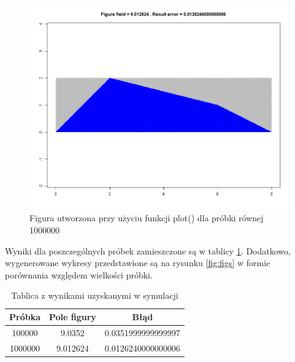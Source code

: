 \documentclass[a4paper,11pt,titlepage]{article}
\begin{document}
\begin{figure}[H]
\centering
\includegraphics[width=1\columnwidth]{img/figure1m.PNG}
\caption{Figura utworzona przy użyciu funkcji plot() dla próbki równej 1000000}
\label{fig:fig1m}
\end{figure}


Wyniki dla poszczególnych próbek zamieszczone są w tablicy \ref{tab:figwynik}. Dodatkowo, wygenerowane wykresy przedstawione są na rysunku \ref{fig:figs} w formie porównania względem wielkości próbki.

\begin{table}[h!]
\centering
\begin{tabular}{ |c|c|c| } 
 \hline
 Próbka & Pole figury & Błąd \\
 \hline
 100000	& 9.0352 &	0.0351999999999997 \\
 1000000	& 9.012624 & 0.0126240000000006 \\
 \hline
\end{tabular}
\caption{Tablica z wynikami uzyskanymi w symulacji}
\label{tab:figwynik}
\end{table}
\end{document}
